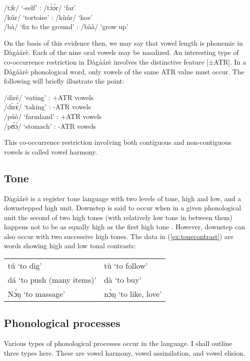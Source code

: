 \ea /tɔ̌r/ ‘-self’ : /tɔ̀ɔ́r/ ‘far’\\
/kǔr/ ‘tortoise’ : /kùúr/ ‘hoe’\\
/bà/ ‘fix to the ground’ : /bàà/ ‘grow up’
\z



On the basis of this evidence then, we may say that vowel length is phonemic in Dàgáárè. Each of the nine oral vowels may be nasalized. An interesting type of co-occurrence restriction in Dàgáárè involves the distinctive feature [±ATR]. In a Dàgáàrè phonological word, only vowels of the same ATR value must occur. The following will briefly illustrate the point:


\ea \label{ex:vowelharmony}/dìré/ ‘eating’ : +ATR vowels\\
/dɪ́rɛ́/ ‘taking’ : -ATR vowels\\
/púò/ ‘farmland’ : +ATR vowels\\
/pʊ́ɔ́/ ‘stomach’ : -ATR vowels\\
\z

This co-occurrence restriction involving both contiguous and non-contiguous vowels is called vowel harmony.

\subsection{Tone}
Dàgáárè is a register tone language with two levels of tone, high and low, and a
downstepped high unit. Downstep is said to occur when in a given phonological unit the
second of two high tones (with relatively low tone in between them) happens not to be as
equally high as the first high tone \citep{Kennedy1966}. However, downstep can also occur with two successive high tones. The data in 
(\ref{ex:tonecontrast}) are words showing high and low tonal contrasts:

\ea \label{ex:tonecontrast} \begin{tabular}{ll}
tú ‘to dig' &tù ‘to follow’  \\
dá ‘to push (many items)’ & dà ‘to buy’\\
Nɔ́ŋ ‘to massage’ &nɔ̀ŋ ‘to like, love’
\end{tabular} 
\z
\subsection{Phonological processes}

Various types of phonological processes occur in the language. I shall
outline three types here. These are vowel harmony, vowel assimilation, and vowel elision.

